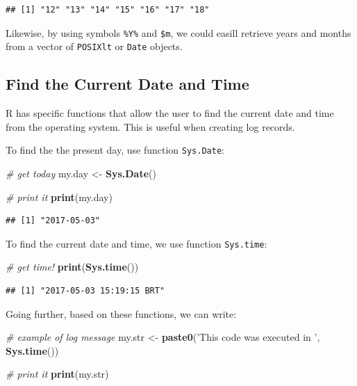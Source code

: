 \documentclass[11pt,]{book}
\newenvironment{Shaded}{\begin{snugshade}}{\end{snugshade}}
\newcommand{\KeywordTok}[1]{\textcolor[rgb]{0.27,0.27,0.27}{\textbf{#1}}}
\newcommand{\StringTok}[1]{\textcolor[rgb]{0.5,0.5,0.5}{#1}}
\newcommand{\CommentTok}[1]{\textcolor[rgb]{0.56,0.35,0.01}{\textit{#1}}}
\newcommand{\NormalTok}[1]{#1}
\begin{document}
\begin{verbatim}
## [1] "12" "13" "14" "15" "16" "17" "18"
\end{verbatim}

Likewise, by using symbols \texttt{\%Y\%} and \texttt{\$m}, we could
easill retrieve years and months from a vector of \texttt{POSIXlt} or
\texttt{Date} objects.

\subsection{Find the Current Date and
Time}\label{find-the-current-date-and-time}

R has specific functions that allow the user to find the current date
and time from the operating system. This is useful when creating log
records.

To find the the present day, use function \texttt{Sys.Date}:

\begin{Shaded}
\begin{Highlighting}[]
\CommentTok{# get today}
\NormalTok{my.day <-}\StringTok{ }\KeywordTok{Sys.Date}\NormalTok{()}

\CommentTok{# print it}
\KeywordTok{print}\NormalTok{(my.day)}
\end{Highlighting}
\end{Shaded}

\begin{verbatim}
## [1] "2017-05-03"
\end{verbatim}

To find the current date and time, we use function \texttt{Sys.time}:

\begin{Shaded}
\begin{Highlighting}[]
\CommentTok{# get time!}
\KeywordTok{print}\NormalTok{(}\KeywordTok{Sys.time}\NormalTok{())}
\end{Highlighting}
\end{Shaded}

\begin{verbatim}
## [1] "2017-05-03 15:19:15 BRT"
\end{verbatim}

Going further, based on these functions, we can write:

\begin{Shaded}
\begin{Highlighting}[]
\CommentTok{# example of log message}
\NormalTok{my.str <-}\StringTok{ }\KeywordTok{paste0}\NormalTok{(}\StringTok{'This code was executed in '}\NormalTok{, }\KeywordTok{Sys.time}\NormalTok{())}

\CommentTok{# print it}
\KeywordTok{print}\NormalTok{(my.str)}
\end{Highlighting}
\end{Shaded}
\end{document}
